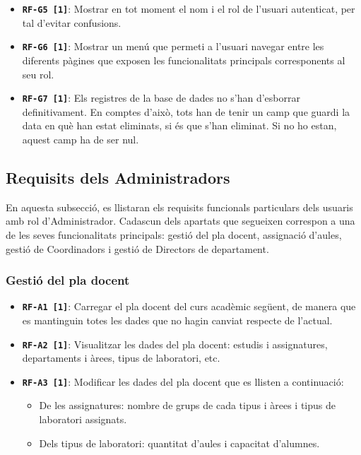 \documentclass[a4paper,12pt]{ThesisStyle}
\begin{document}
\begin{itemize}
  \item \texttt{\textbf{RF-G5 [1]}}: Mostrar en tot moment el nom i el rol de l'usuari autenticat, per tal d'evitar confusions.
  \item \texttt{\textbf{RF-G6 [1]}}: Mostrar un menú que permeti a l'usuari navegar entre les diferents pàgines que exposen les funcionalitats principals corresponents al seu rol.
  \item \texttt{\textbf{RF-G7 [1]}}: Els registres de la base de dades no s'han d'esborrar definitivament. En comptes d'això, tots han de tenir un camp que guardi la data en què han estat eliminats, si és que s'han eliminat. Si no ho estan, aquest camp ha de ser nul.
\end{itemize}


\subsection{Requisits dels Administradors}
\label{subsec:requisits_administradors}

En aquesta subsecció, es llistaran els requisits funcionals particulars dels usuaris amb rol d'Administrador. Cadascun dels apartats que segueixen correspon a una de les seves funcionalitats principals: gestió del pla docent, assignació d'aules, gestió de Coordinadors i gestió de Directors de departament.

\subsubsection{Gestió del pla docent}
\begin{itemize}
  \item \texttt{\textbf{RF-A1 [1]}}: Carregar el pla docent del curs acadèmic següent, de manera que es mantinguin totes les dades que no hagin canviat respecte de l'actual.
  \item \texttt{\textbf{RF-A2 [1]}}: Visualitzar les dades del pla docent: estudis i assignatures, departaments i àrees, tipus de laboratori, etc.
  \item \texttt{\textbf{RF-A3 [1]}}: Modificar les dades del pla docent que es llisten a continuació:
  \begin{itemize}
    \item De les assignatures: nombre de grups de cada tipus i àrees i tipus de laboratori assignats.
    \item Dels tipus de laboratori: quantitat d'aules i capacitat d'alumnes.
  \end{itemize}
\end{itemize}
\end{document}
